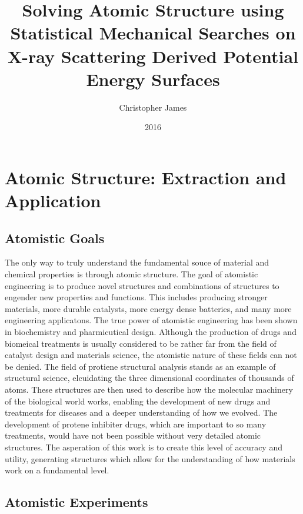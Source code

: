 \documentclass{uscthesis}
\title{Solving Atomic Structure using Statistical Mechanical Searches on X-ray Scattering Derived Potential Energy Surfaces}
\author{Christopher James}{Wright}    %
\date{2016}                      %
\theoremstyle{definition}
\theoremstyle{plain}
\begin{document}
\linenumbers



\chapter{Atomic Structure: Extraction and Application}
\section{Atomistic Goals}
The only way to truly understand the fundamental souce of material and chemical properties is through atomic structure.
The goal of atomistic engineering is to produce novel structures and combinations of structures to engender new properties and functions.
This includes producing stronger materials, more durable catalysts, more energy dense batteries, and many more engineering applicatons.
The true power of atomistic engineering has been shown in biochemistry and pharmicutical design.
Although the production of drugs and biomeical treatments is usually considered to be rather far from the field of catalyst design and materials science, the atomistic nature of these fields can not be denied.
The field of protiene structural analysis stands as an example of structural science, elcuidating the three dimensional coordinates of thousands of atoms.
These structures are then used to describe how the molecular machinery of the biological world works, enabling the development of new drugs and treatments for diseases and a deeper understanding of how we evolved.
The development of protene inhibiter drugs, which are important to so many treatments, would have not been possible without very detailed atomic structures.
The asperation of this work is to create this level of accuracy and utility, generating structures which allow for the understanding of how materials work on a fundamental level.
\section{Atomistic Experiments}
\end{document}
